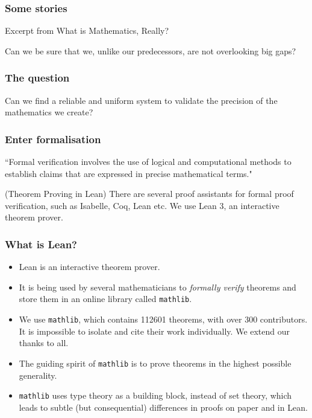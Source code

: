 \documentclass{beamer} %
\begin{document}
\begin{frame}
\frametitle{Some stories}
Excerpt from What is Mathematics, Really?
\begin{center}
Can we be sure that we, unlike our predecessors, are not overlooking big gaps?
\end{center}    
\end{frame}
\begin{frame}
\frametitle{The question}
\begin{center}
Can we find a reliable and uniform system to validate the precision of the mathematics we create?
\end{center}
\end{frame}
\begin{frame}
\frametitle{Enter formalisation}
\begin{center}
``Formal verification involves the use of logical and computational methods to establish claims that are expressed in precise mathematical terms."  
\end{center}
(Theorem Proving in Lean) \pause \newline
There are several proof assistants for formal proof verification, such as Isabelle, Coq, Lean etc. \pause \newline 
We use Lean 3, an interactive theorem prover.
\end{frame}
\begin{frame}
\frametitle{What is Lean?}
\begin{itemize}
\item[\textbullet] Lean is an interactive theorem prover. \pause
\item[\textbullet] It is being used by several mathematicians to \textit{formally verify} theorems and store 
them in an online library called \texttt{mathlib}. \pause
\item[\textbullet] We use \texttt{mathlib}, which contains 112601 theorems, with over 300 contributors. 
It is impossible to isolate and cite their work individually. We extend our thanks to all. \pause
\item[\textbullet] The guiding spirit of \texttt{mathlib} is to prove theorems in the highest possible generality. \pause
\item[\textbullet] \texttt{mathlib} uses type theory as a building block, instead of set theory, which leads to subtle 
(but consequential) differences in proofs on paper and in Lean. 
\end{itemize}
\end{frame}
\end{document}
